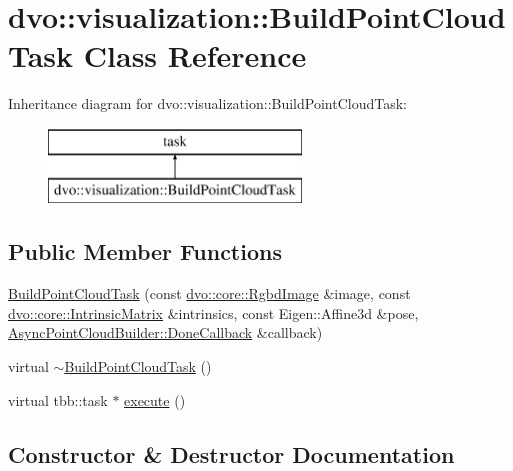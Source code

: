 \hypertarget{classdvo_1_1visualization_1_1_build_point_cloud_task}{}\section{dvo\+:\+:visualization\+:\+:Build\+Point\+Cloud\+Task Class Reference}
\label{classdvo_1_1visualization_1_1_build_point_cloud_task}
Inheritance diagram for dvo\+:\+:visualization\+:\+:Build\+Point\+Cloud\+Task\+:\begin{figure}[H]
\begin{center}
\leavevmode
\includegraphics[height=2.000000cm]{classdvo_1_1visualization_1_1_build_point_cloud_task}
\end{center}
\end{figure}
\subsection*{Public Member Functions}
\begin{DoxyCompactItemize}
\item 
\mbox{\hyperlink{classdvo_1_1visualization_1_1_build_point_cloud_task_a86d5efbdab6f61d69949d86291a568ee}{Build\+Point\+Cloud\+Task}} (const \mbox{\hyperlink{structdvo_1_1core_1_1_rgbd_image}{dvo\+::core\+::\+Rgbd\+Image}} \&image, const \mbox{\hyperlink{structdvo_1_1core_1_1_intrinsic_matrix}{dvo\+::core\+::\+Intrinsic\+Matrix}} \&intrinsics, const Eigen\+::\+Affine3d \&pose, \mbox{\hyperlink{classdvo_1_1visualization_1_1_async_point_cloud_builder_aeea54b24aabbcfe12b2db923c8befc77}{Async\+Point\+Cloud\+Builder\+::\+Done\+Callback}} \&callback)
\item 
virtual \mbox{\hyperlink{classdvo_1_1visualization_1_1_build_point_cloud_task_a36ec8829378677b87aca9dd3ef9c5a68}{$\sim$\+Build\+Point\+Cloud\+Task}} ()
\item 
virtual tbb\+::task $\ast$ \mbox{\hyperlink{classdvo_1_1visualization_1_1_build_point_cloud_task_aa9ee4ddd7a6ed4fda80328ed542b7f03}{execute}} ()
\end{DoxyCompactItemize}


\subsection{Constructor \& Destructor Documentation}
\mbox{\label{classdvo_1_1visualization_1_1_build_point_cloud_task_a86d5efbdab6f61d69949d86291a568ee}} 
